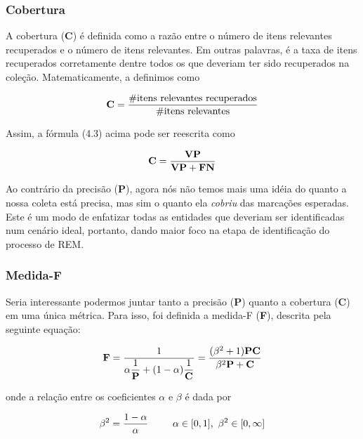 \documentclass[11pt]{report}
\begin{document}
\subsubsection{Cobertura}

\indent\indent A cobertura (\textbf{C}) é definida como a razão entre o número de itens relevantes recuperados e o número de itens relevantes.
Em outras palavras, é a taxa de itens recuperados corretamente dentre todos os que deveriam ter sido recuperados na coleção. Matematicamente, a definimos como

\begin{equation}
 \text{\textbf{C}} = \dfrac{\text{\#itens relevantes recuperados}}{\text{\#itens relevantes}}
\end{equation}

Assim, a fórmula (4.3) acima pode ser reescrita como

\begin{equation}
 \text{\textbf{C}} = \dfrac{\text{\textbf{VP}}}{\text{\textbf{VP}} + \text{\textbf{FN}}}
\end{equation}

Ao contrário da precisão (\textbf{P}), agora nós não temos mais uma idéia do quanto a nossa coleta está precisa, mas sim o quanto ela \textit{cobriu} das marcações esperadas. Este é um modo de enfatizar todas as entidades que deveriam ser identificadas num cenário ideal, portanto, dando maior foco na etapa de identificação do processo de REM.

\subsubsection{Medida-F}

\indent\indent Seria interessante podermos juntar tanto a precisão (\textbf{P}) quanto a cobertura (\textbf{C}) em uma única métrica. Para isso, foi definida a medida-F (\textbf{F}), descrita
pela seguinte equação:

\begin{equation}
 \text{\textbf{F}} = \dfrac{1}{\alpha\dfrac{1}{\text{\textbf{P}}} + (1 - \alpha)\dfrac{1}{\text{\textbf{C}}}} = \dfrac{(\beta^2 + 1)\text{\textbf{PC}}}{\beta^2\text{\textbf{P}} + \text{\textbf{C}}}
\end{equation}

onde a relação entre os coeficientes $\alpha$ e $\beta$ é dada por

\begin{equation}
 \beta^2 = \dfrac{1 - \alpha}{\alpha} \enspace\enspace\enspace\enspace\enspace \alpha \in [0, 1]\text{,\enspace}\beta^2 \in [0, \infty]
\end{equation}
\end{document}
